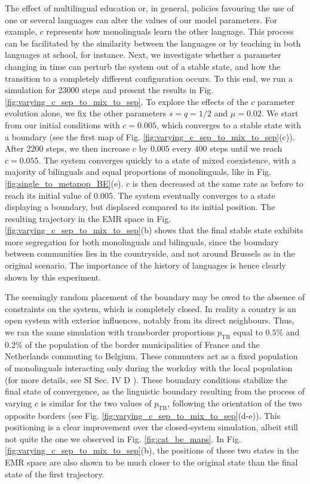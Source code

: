 \documentclass[../thesis.tex]{subfiles}
\begin{document}
The effect of multilingual education or, in general, policies favouring the use of one or
several languages can alter the values of our model parameters. For example, $c$
represents how monolinguals learn the other language. This process can be facilitated by
the similarity between the languages or by teaching in both languages at school, for
instance. Next, we investigate whether a parameter changing in time can perturb the
system out of a stable state, and how the transition to a completely different
configuration occurs. To this end, we run a simulation for 23000 steps and present the
results in Fig. \ref{fig:varying_c_sep_to_mix_to_sep}. To explore the effects of the $c$
parameter evolution alone, we fix the other parameters $s = q = 1/2$ and $\mu = 0.02$.
We start from our initial conditions with $c = 0.005$, which converges to a stable state
with a boundary (see the first map of Fig.
\ref{fig:varying_c_sep_to_mix_to_sep}(c)). After 2200 steps, we then increase $c$
by $0.005$ every $400$ steps until we reach $c = 0.055$. The system converges quickly to
a state of mixed coexistence, with a majority of bilinguals and equal proportions of
monolinguals, like in Fig. \ref{fig:single_to_metapop_BE}(e). $c$ is then
decreased at the same rate as before to reach its initial value of $0.005$. The system
eventually converges to a state displaying a boundary, but displaced compared to its
initial position. The
resulting trajectory in the EMR space in Fig.
\ref{fig:varying_c_sep_to_mix_to_sep}(b) shows that the final stable state
exhibits more segregation for both monolinguals and bilinguals, since the boundary
between communities lies in the countryside, and not around Brussels as in the original
scenario. The importance of the history of languages is hence clearly shown by this
experiment.

The seemingly random placement of the boundary may be owed to the absence of constraints
on the system, which is completely closed. In reality a country is an open system with
exterior influences, notably from its direct neighbours. Thus, we ran the same simulation
with transborder proportions $p_{\text{TB}}$ equal to $0.5\%$ and $0.2\%$ of the
population of the border municipalities of France and the Netherlands commuting to
Belgium. These commuters act as a fixed population of monolinguals interacting only
during the workday with the local population (for more details, see SI Sec. IV D
\cite{supp}). These boundary conditions stabilize the final state of convergence, as the
linguistic boundary resulting from the process of varying $c$ is similar for the two
values of $p_{\text{TB}}$, following the orientation of the two opposite borders (see
Fig. \ref{fig:varying_c_sep_to_mix_to_sep}(d-e)). This positioning is a
clear improvement over the closed-system simulation, albeit still not quite the one we
observed in Fig. \ref{fig:cat_be_maps}. In Fig.
\ref{fig:varying_c_sep_to_mix_to_sep}(b), the positions of these two states in
the EMR space are also shown to be much closer to the original state than the final
state of the first trajectory.
\end{document}
